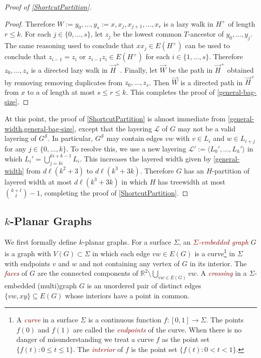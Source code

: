 \documentclass{patmorin}
\theoremstyle{plain}
\theoremstyle{definition}
\newcommand{\defin}[1]{\textcolor{Maroon}{\emph{#1}}}
\newcommand{\note}[2]{\noindent{\color{red}[#1:~#2]}}
\renewcommand{\SS}{\mathcal{S}}
\renewcommand{\le}{\leqslant}
\newcommand{\R}{\mathbb{R}}
\begin{document}
\begin{proof}[Proof of \cref{ShortcutPartition}]
\begin{proof}
  Therefore $W:=y_0,\ldots,y_s:=x,x_j,x_{j+1},\ldots,x_r$ is a lazy walk in $H^+$ of length $r\le k$.  For each $j\in \{0,\ldots,s\}$, let $z_j$ be the lowest common $T$-ancestor of $y_0,\ldots,y_j$.  The same reasoning used to conclude that $xx_j\in E(H^+)$ can be used to conclude that $z_{i-1}=z_i$ or $z_{i-1}z_i\in E(H^+)$ for each $i\in\{1,\ldots,s\}$.  Therefore $z_0,\ldots,z_s$ is a directed lazy walk in $\overrightarrow{H}^+$.  Finally, let $\overrightarrow{W}$ be the path in $\overrightarrow{H}^+$ obtained by removing removing duplicates from $z_0,\ldots,z_s$.  Then $\overrightarrow{W}$ is a directed path in $\overrightarrow{H}^+$ from $x$ to $a$ of length at most $s\le r\le k$.  This completes the proof of \cref{general-bag-size}.
\end{proof}

At this point, the proof of \cref{ShortcutPartition} is almost immediate from \cref{general-width,general-bag-size}, except that the layering $\mathcal{L}$ of $G$ may not be a valid layering of $G^{\SS}$.  In particular, $G^{\SS}$ may contain edges $vw$ with $v\in L_i$ and $w\in L_{i+j}$ for any $j\in\{0,\ldots,k\}$.  To resolve this, we use a new layering $\mathcal{L}':=\langle L_0',\ldots,L_h'\rangle$ in which $L_i'=\bigcup_{j=ki}^{ki+k-1} L_i$.  This increases the layered width given by \cref{general-width} from $d\ell(k^2+3)$ to $d\ell(k^3+3k)$.  Therefore $G$ has an $H$-partition of layered width at most $d\ell(k^3+3k)$ in which $H$ has treewidth at most $\binom{k+t}{t}-1$, completing the proof of \cref{ShortcutPartition}.
\end{proof}

\subsection{\boldmath $k$-Planar Graphs}
\label{k_planar_section}


We first formally define $k$-planar graphs.  For a surface $\Sigma$,  an \defin{$\Sigma$-embedded graph} $G$ is a graph with $V(G)\subset\Sigma$ in which each edge $vw\in E(G)$ is a curve\footnote{A \defin{curve} in a surface $\Sigma$ is a continuous function $f:[0,1]\to \Sigma$. The points $f(0)$ and $f(1)$ are called the \defin{endpoints} of the curve.  When there is no danger of misunderstanding we treat a curve $f$ as the point set $\{f(t):0\le t\le 1\}$.  The \defin{interior} of $f$ is the point set $\{f(t):0<t<1\}$.} in $\Sigma$ with endpoints $v$ and $w$ and not containing any vertex of $G$ in its interior. The \defin{faces} of $G$ are the connected components of $\R^2\setminus \bigcup_{vw\in E(G)} vw$. A \defin{crossing} in a $\Sigma$-embedded (multi)graph $G$ is an unordered pair of distinct edges $\{vw,xy\}\subseteq E(G)$ whose interiors have a point in common.
\end{document}
